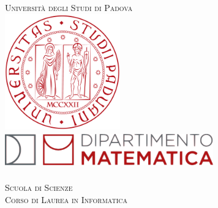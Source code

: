 \begin{titlepage}
    
    \newcommand{\HRule}{\rule{\linewidth}{0.5mm}} 
    
    \center
    
    
    \textsc{\LARGE Università degli Studi di Padova}\\[1cm] 
    
    
    \includegraphics[height=5cm]{img/UniPd.png}\\[1cm]
    
    \includegraphics[height=1.5cm, width = 9cm]{img/MathDip.png}\\
    \textsc{\dipartimento}\\[1.2cm]
    \textsc{\Large Scuola di Scienze}\\[0.5cm] 
    
    \textsc{\large Corso di Laurea in Informatica}\\[0.5cm] 
    
    \vspace{2.5cm}
    
    

\end{titlepage}
